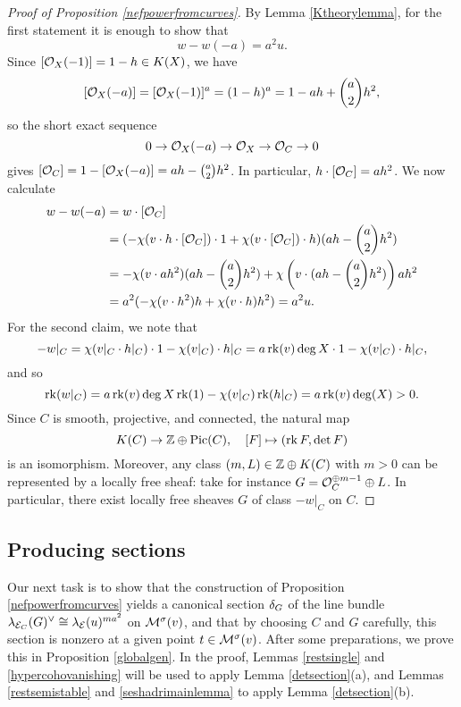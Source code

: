 \begin{proof}[Proof of Proposition \ref{nefpowerfromcurves}]
    By Lemma \ref{Ktheorylemma}, for the first statement it is enough to show that
    \[ w - w(-a) = a^2 u. \]
    Since $[\mathcal{O}_X(-1)] = 1 - h \in K(X)$, we have
    \[ [\mathcal{O}_X(-a)] = [\mathcal{O}_X(-1)]^a = (1 - h)^a = 1 - a h + \binom{a}{2} h^2, \]
    so the short exact sequence
    \[ 0 \to \mathcal{O}_X(-a) \to \mathcal{O}_X \to \mathcal{O}_C \to 0 \]
    gives $[\mathcal{O}_C] = 1 - [\mathcal{O}_X(-a)] = a h - \binom{a}{2} h^2$. In particular, $h \cdot [\mathcal{O}_C] = a h^2$. We now calculate
    \begin{align*}
        w - w(-a) & = w \cdot [\mathcal{O}_C] \\
        & = (-\chi(v \cdot h \cdot [\mathcal{O}_C]) \cdot 1 + \chi(v \cdot [\mathcal{O}_C]) \cdot h) (a h - \binom{a}{2} h^2) \\
        & = - \chi(v \cdot ah^2) (a h - \binom{a}{2} h^2) + \chi\left(v \cdot (a h - \binom{a}{2} h^2)\right) a h^2 \\
        & = a^2 ( - \chi(v \cdot h^2) h + \chi(v \cdot h) h^2) = a^2 u.
    \end{align*}
    For the second claim, we note that 
    \[ -w|_C = \chi(v|_C \cdot h|_C) \cdot 1 - \chi(v|_C) \cdot h|_C = a \operatorname{\mathrm{rk}}(v) \deg X \cdot 1 - \chi(v|_C) \cdot h|_C, \]
    and so 
    \[ \operatorname{\mathrm{rk}}(w|_C) = a \operatorname{\mathrm{rk}}(v) \deg X \operatorname{\mathrm{rk}}(1) - \chi(v|_C) \operatorname{\mathrm{rk}}(h|_C) = a \operatorname{\mathrm{rk}}(v) \deg(X) > 0. \] 
    Since $C$ is smooth, projective, and connected, the natural map 
    \[ K(C) \to \mathbb{Z} \oplus \mathrm{Pic}(C), \quad [F] \mapsto (\operatorname{\mathrm{rk}} F, \det F) \] 
    is an isomorphism. Moreover, any class $(m, L) \in \mathbb{Z} \oplus K(C)$ with $m > 0$ can be represented by a locally free sheaf: take for instance $G = \mathcal{O}_C^{\oplus m-1} \oplus L$. In particular, there exist locally free sheaves $G$ of class $- w|_C$ on $C$.
\end{proof}

\subsection{Producing sections}
Our next task is to show that the construction of Proposition \ref{nefpowerfromcurves} yields a canonical section $\delta_G$ of the line bundle $\lambda_{\mathcal{E}_C}(G)^\vee \cong \lambda_{\mathcal{E}}(u)^{m a^2}$ on $\mathcal{M}^\sigma(v)$, and that by choosing $C$ and $G$ carefully, this section is nonzero at a given point $t \in \mathcal{M}^\sigma(v)$. After some preparations, we prove this in Proposition \ref{globalgen}. In the proof, Lemmas \ref{restsingle} and \ref{hypercohovanishing} will be used to apply Lemma \ref{detsection}(a), and Lemmas \ref{restsemistable} and \ref{seshadrimainlemma} to apply Lemma \ref{detsection}(b).

